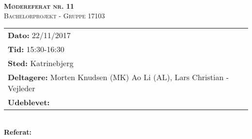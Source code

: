 
\newcommand{\HRule}{\rule{\linewidth}{0.1mm}}


	\begin{center}
		{\huge \bfseries \textsc{Mødereferat nr. 11}}\\
		\textsc{\large Bachelorprojekt - Gruppe 17103}\\[0.3cm]
	\end{center}
	\begin{tabular}{ll}
	\large \textbf{Dato:} 22/11/2017  	\\ %
	\large \textbf{Tid:}  15:30-16:30 	\\ %
	\large \textbf{Sted:} Katrinebjerg		\\ %
	\large \textbf{Deltagere:} Morten Knudsen (MK) Ao Li (AL), Lars Christian - Vejleder \\
	\large \textbf{Udeblevet:} 
	\end{tabular}\\
	\phantom{\,}\hspace{0.1em} \large \textbf{Referat:}
